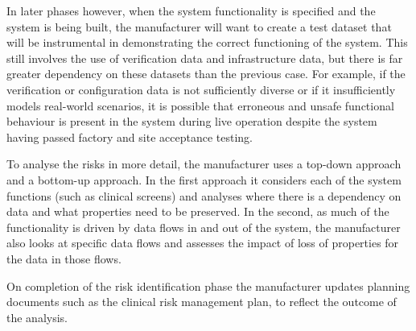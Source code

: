 In later phases however, when the system functionality is specified and the system is being built, the manufacturer will want to create a test \gls{dataset} that will be instrumental in demonstrating the correct functioning of the system. This still involves the use of \gls{verification} data and infrastructure data, but there is far greater dependency on these \glspl{dataset} than the previous case. For example, if the \gls{verification} or \gls{configuration data} is not sufficiently diverse or if it insufficiently models real-world scenarios, it is possible that erroneous and unsafe functional behaviour is present in the system during live operation despite the system having passed factory and site acceptance testing.

To analyse the risks in more detail, the manufacturer uses a top-down approach and a bottom-up approach. In the first approach it considers each of the system functions (such as clinical screens) and analyses where there is a dependency on data and what properties need to be preserved. In the second, as much of the functionality is driven by data flows in and out of the system, the manufacturer also looks at specific data flows and assesses the impact of loss of properties for the data in those flows.

On completion of the risk identification phase the manufacturer updates planning documents such as the clinical risk management plan, to reflect the outcome of the analysis.

